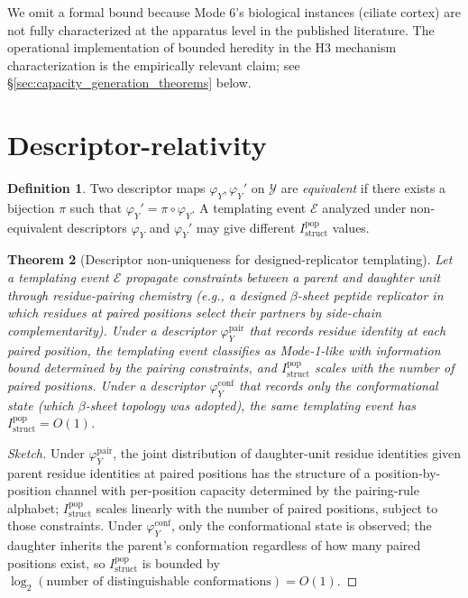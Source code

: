 \documentclass[11pt]{article}
\theoremstyle{plain}
\newtheorem{theorem}{Theorem}
\theoremstyle{definition}
\newtheorem{definition}[theorem]{Definition}
\newcommand{\Istructpop}{I_{\mathrm{struct}}^{\mathrm{pop}}}
\newcommand{\descY}{\varphi_Y}
\begin{document}
We omit a formal bound because Mode 6's biological instances (ciliate cortex) are not fully characterized at the apparatus level in the published literature. The operational implementation of bounded heredity in the H3 mechanism characterization is the empirically relevant claim; see \S\ref{sec:capacity_generation_theorems} below.


\section{Descriptor-relativity}
\label{sec:descriptor}

\begin{definition}
Two descriptor maps $\descY, \descY'$ on $\mathcal{Y}$ are \emph{equivalent} if there exists a bijection $\pi$ such that $\descY' = \pi \circ \descY$. A templating event $\mathcal{E}$ analyzed under non-equivalent descriptors $\descY$ and $\descY'$ may give different $\Istructpop$ values.
\end{definition}

\begin{theorem}[Descriptor non-uniqueness for designed-replicator templating]
\label{thm:descriptor_nonuniqueness}
Let a templating event $\mathcal{E}$ propagate constraints between a parent and daughter unit through residue-pairing chemistry (e.g., a designed $\beta$-sheet peptide replicator in which residues at paired positions select their partners by side-chain complementarity). Under a descriptor $\descY^{\mathrm{pair}}$ that records residue identity at each paired position, the templating event classifies as Mode-1-like with information bound determined by the pairing constraints, and $\Istructpop$ scales with the number of paired positions. Under a descriptor $\descY^{\mathrm{conf}}$ that records only the conformational state (which $\beta$-sheet topology was adopted), the same templating event has $\Istructpop = O(1)$.
\end{theorem}

\begin{proof}[Sketch]
Under $\descY^{\mathrm{pair}}$, the joint distribution of daughter-unit residue identities given parent residue identities at paired positions has the structure of a position-by-position channel with per-position capacity determined by the pairing-rule alphabet; $\Istructpop$ scales linearly with the number of paired positions, subject to those constraints. Under $\descY^{\mathrm{conf}}$, only the conformational state is observed; the daughter inherits the parent's conformation regardless of how many paired positions exist, so $\Istructpop$ is bounded by $\log_2(\text{number of distinguishable conformations}) = O(1)$.
\end{proof}
\end{document}
